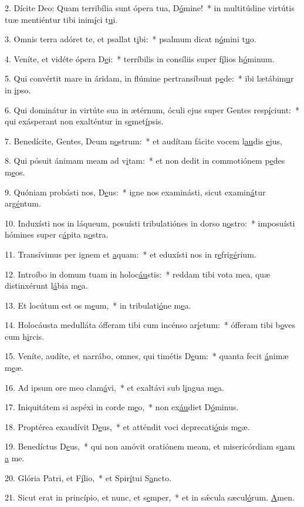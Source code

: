 2. Dícite Deo: Quam terribília sunt ópera tua, D\uline{ó}mine!~* in multitúdine virtútis tuæ mentiéntur tibi inim\uline{í}ci t\uline{u}i.\par 
3. Omnis terra adóret te, et psallat t\uline{i}bi:~* psalmum dicat n\uline{ó}mini t\uline{u}o.\par 
4. Veníte, et vidéte ópera D\uline{e}i:~* terríbilis in consíliis super f\uline{í}lios h\uline{ó}minum.\par 
5. Qui convértit mare in áridam, in flúmine pertransíbunt p\uline{e}de:~* ibi lætábim\uline{u}r in \uline{i}pso.\par 
6. Qui dominátur in virtúte sua in ætérnum, óculi ejus super Gentes resp\uline{í}ciunt:~* qui exásperant non exalténtur in s\uline{e}met\uline{í}psis.\par 
7. Benedícite, Gentes, Deum n\uline{o}strum:~* et audítam fácite vocem l\uline{au}dis \uline{e}jus,\par 
8. Qui pósuit ánimam meam ad v\uline{i}tam:~* et non dedit in commotiónem p\uline{e}des m\uline{e}os.\par 
9. Quóniam probásti nos, D\uline{e}us:~* igne nos examinásti, sicut examin\uline{á}tur arg\uline{é}ntum.\par 
10. Induxísti nos in láqueum, posuísti tribulatiónes in dorso n\uline{o}stro:~* imposuísti hómines super c\uline{á}pita n\uline{o}stra.\par 
11. Transívimus per ignem et \uline{a}quam:~* et eduxísti nos in r\uline{e}frig\uline{é}rium.\par 
12. Introíbo in domum tuam in holoc\uline{áu}stis:~* reddam tibi vota mea, quæ distinxérunt l\uline{á}bia m\uline{e}a.\par 
13. Et locútum est os m\uline{e}um,~* in tribulati\uline{ó}ne m\uline{e}a.\par 
14. Holocáusta medulláta ófferam tibi cum incénso ar\uline{í}etum:~* ófferam tibi b\uline{o}ves cum h\uline{i}rcis.\par 
15. Veníte, audíte, et narrábo, omnes, qui timétis D\uline{e}um:~* quanta fecit \uline{á}nimæ m\uline{e}æ.\par 
16. Ad ipsum ore meo clam\uline{á}vi,~* et exaltávi sub l\uline{i}ngua m\uline{e}a.\par 
17. Iniquitátem si aspéxi in corde m\uline{e}o,~* non ex\uline{áu}diet D\uline{ó}minus.\par 
18. Proptérea exaudívit D\uline{e}us,~* et atténdit voci deprecati\uline{ó}nis m\uline{e}æ.\par 
19. Benedíctus D\uline{e}us,~* qui non amóvit oratiónem meam, et misericórdiam s\uline{u}am \uline{a} me.\par 
20. Glória Patri, et F\uline{í}lio,~* et Spir\uline{í}tui S\uline{a}ncto.\par 
21. Sicut erat in princípio, et nunc, et s\uline{e}mper,~* et in sǽcula sæcul\uline{ó}rum. \uline{A}men.\par 
